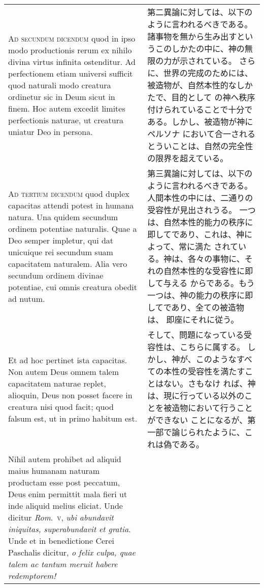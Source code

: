 \documentclass[10pt]{jsarticle} %
\begin{document}
\begin{longtable}{p{21em}p{21em}}
\\


{\scshape Ad secundum dicendum} quod in ipso modo
productionis rerum ex nihilo divina virtus infinita ostenditur. Ad
perfectionem etiam universi sufficit quod naturali modo creatura
ordinetur sic in Deum sicut in finem. Hoc autem excedit limites
perfectionis naturae, ut creatura uniatur Deo in persona.


&

第二異論に対しては、以下のように言われるべきである。
諸事物を無から生み出すというこのしかたの中に、神の無限の力が示されている。
さらに、世界の完成のためには、被造物が、自然本性的なしかたで、目的として
 の神へ秩序付けられていることで十分である。しかし、被造物が神にペルソナ
 において合一されるとういことは、自然の完全性の限界を超えている。


\\


{\scshape Ad tertium dicendum} quod duplex capacitas
attendi potest in humana natura. Una quidem secundum ordinem potentiae
naturalis. Quae a Deo semper impletur, qui dat unicuique rei secundum
suam capacitatem naturalem. Alia vero secundum ordinem divinae
potentiae, cui omnis creatura obedit ad nutum. 

&

第三異論に対しては、以下のように言われるべきである。
人間本性の中には、二通りの受容性が見出されうる。
一つは、自然本性的能力の秩序に即してであり、これは、神によって、常に満た
 されている。神は、各々の事物に、それの自然本性的な受容性に即して与える
 からである。もう一つは、神の能力の秩序に即してであり、全ての被造物は、
 即座にそれに従う。

\\

Et ad hoc pertinet ista
capacitas. Non autem Deus omnem talem capacitatem naturae replet,
alioquin, Deus non posset facere in creatura nisi quod facit; quod
falsum est, ut in primo habitum est. 


&

そして、問題になっている受容性は、こちらに属する。
しかし、神が、このようなすべての本性の受容性を満たすことはない。さもなけ
 れば、神は、現に行っている以外のことを被造物において行うことができない
 ことになるが、第一部で論じられたように、これは偽である。


\\


Nihil autem prohibet ad aliquid
maius humanam naturam productam esse post peccatum, Deus enim permittit
mala fieri ut inde aliquid melius eliciat. Unde dicitur {\itshape Rom}.~{\scshape v}, {\itshape ubi
abundavit iniquitas, superabundavit et gratia}. Unde et in benedictione
Cerei Paschalis dicitur, {\itshape o felix culpa, quae talem ac tantum meruit
habere redemptorem!}



\end{longtable}
\end{document}
